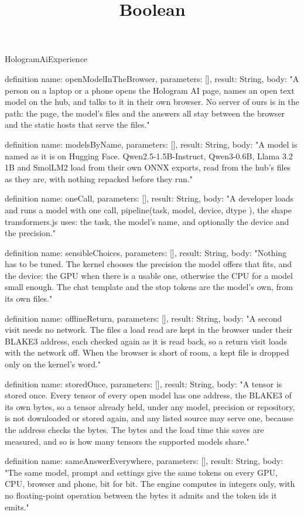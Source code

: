 \begin{lexlean}{HologramAiExperience}
\title{Boolean}
\begin{semanticmodule}
definition{
  name: openModelInTheBrowser,
  parameters: [],
  result: String,
  body: "A person on a laptop or a phone opens the Hologram AI page, names an open text model on the hub, and talks to it in their own browser. No server of ours is in the path: the page, the model's files and the answers all stay between the browser and the static hosts that serve the files."
}

definition{
  name: modelsByName,
  parameters: [],
  result: String,
  body: "A model is named as it is on Hugging Face. Qwen2.5-1.5B-Instruct, Qwen3-0.6B, Llama 3.2 1B and SmolLM2 load from their own ONNX exports, read from the hub's files as they are, with nothing repacked before they run."
}

definition{
  name: oneCall,
  parameters: [],
  result: String,
  body: "A developer loads and runs a model with one call, pipeline(task, model, { device, dtype }), the shape transformers.js uses: the task, the model's name, and optionally the device and the precision."
}

definition{
  name: sensibleChoices,
  parameters: [],
  result: String,
  body: "Nothing has to be tuned. The kernel chooses the precision the model offers that fits, and the device: the GPU when there is a usable one, otherwise the CPU for a model small enough. The chat template and the stop tokens are the model's own, from its own files."
}

definition{
  name: offlineReturn,
  parameters: [],
  result: String,
  body: "A second visit needs no network. The files a load read are kept in the browser under their BLAKE3 address, each checked again as it is read back, so a return visit loads with the network off. When the browser is short of room, a kept file is dropped only on the kernel's word."
}

definition{
  name: storedOnce,
  parameters: [],
  result: String,
  body: "A tensor is stored once. Every tensor of every open model has one address, the BLAKE3 of its own bytes, so a tensor already held, under any model, precision or repository, is not downloaded or stored again, and any listed source may serve one, because the address checks the bytes. The bytes and the load time this saves are measured, and so is how many tensors the supported models share."
}

definition{
  name: sameAnswerEverywhere,
  parameters: [],
  result: String,
  body: "The same model, prompt and settings give the same tokens on every GPU, CPU, browser and phone, bit for bit. The engine computes in integers only, with no floating-point operation between the bytes it admits and the token ids it emits."
}


\end{semanticmodule}
\end{lexlean}
